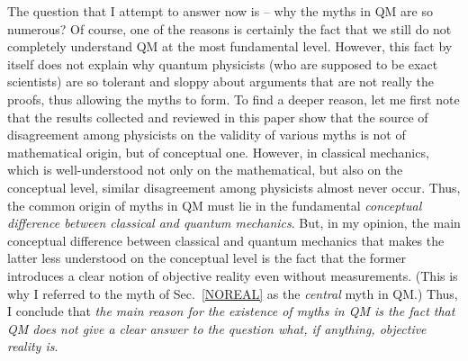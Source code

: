 \documentclass[12pt]{article}
\begin{document}
The question that I attempt to answer now is -- why the myths in QM
are so numerous? Of course, one of the reasons is certainly the fact 
that we still do not completely understand QM at the most fundamental level.
However, this fact by itself does not explain why 
quantum physicists (who are supposed
to be exact scientists) are so tolerant and sloppy about arguments 
that are not really the proofs, thus allowing the myths to form. 
To find a deeper reason, let me first note that
the results collected and reviewed in this paper 
show that the source of disagreement among physicists on the validity 
of various myths is not of mathematical origin, but of 
conceptual one. However, in 
classical mechanics, which is well-understood
not only on the mathematical, but also on the conceptual level,
similar disagreement among physicists almost never occur.
Thus, the common origin of myths in QM must lie in the 
fundamental {\em conceptual difference between classical 
and quantum mechanics}. But, in my opinion,
the main conceptual difference between classical and quantum mechanics
that makes the latter less understood on the conceptual level 
is the fact that the former introduces a clear notion of objective reality 
even without measurements. (This is why I referred 
to the myth of Sec.~\ref{NOREAL} as the {\em central} myth in QM.) 
Thus, I conclude that {\em the main reason for the existence of myths in QM
is the fact that QM does not give a clear answer to the question 
what, if anything, objective reality is}.  
\end{document}
